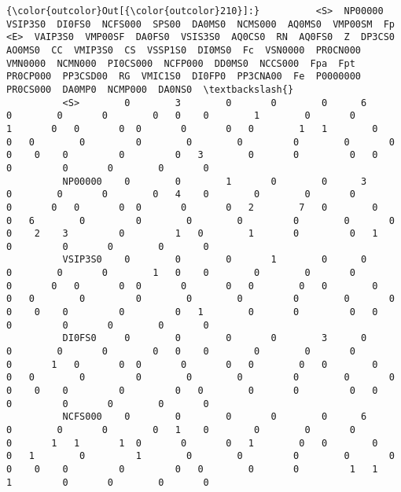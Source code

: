 \documentclass[11pt]{article}
\begin{document}
\begin{Verbatim}[commandchars=\\\{\}]
{\color{outcolor}Out[{\color{outcolor}210}]:}          <S>  NP00000  VSIP3S0  DI0FS0  NCFS000  SPS00  DA0MS0  NCMS000  AQ0MS0  VMP00SM  Fp  <E>  VAIP3S0  VMP00SF  DA0FS0  VSIS3S0  AQ0CS0  RN  AQ0FS0  Z  DP3CS0  AO0MS0  CC  VMIP3S0  CS  VSSP1S0  DI0MS0  Fc  VSN0000  PR0CN000  VMN0000  NCMN000  PI0CS000  NCFP000  DD0MS0  NCCS000  Fpa  Fpt  PR0CP000  PP3CSD00  RG  VMIC1S0  DI0FP0  PP3CNA00  Fe  P0000000  PR0CS000  DA0MP0  NCMP000  DA0NS0  \textbackslash{}
          <S>        0        3        0       0        0      6       0        0       0        0   0    0        1        0       0        1       0   0       0  0       0       0   0        1   1        0       0   0        0         0        0        0         0        0       0        0    0    0         0         0   3        0       0         0   0         0         0       0        0       0   
          NP00000    0        0        1       0        0      3       0        0       0        0   4    0        0        0       0        0       0   0       0  0       0       0   2        7   0        0       0   6        0         0        0        0         0        0       0        0    2    3         0         1   0        1       0         0   1         0         0       0        0       0   
          VSIP3S0    0        0        0       1        0      0       0        0       0        1   0    0        0        0       0        0       0   0       0  0       0       0   0        0   0        0       0   0        0         0        0        0         0        0       0        0    0    0         0         0   1        0       0         0   0         0         0       0        0       0   
          DI0FS0     0        0        0       0        3      0       0        0       0        0   0    0        0        0       0        0       1   0       0  0       0       0   0        0   0        0       0   0        0         0        0        0         0        0       0        0    0    0         0         0   0        0       0         0   0         0         0       0        0       0   
          NCFS000    0        0        0       0        0      6       0        0       0        0   1    0        0        0       0        0       1   1       1  0       0       0   1        0   0        0       0   1        0         1        0        0         0        0       0        0    0    0         0         0   0        0       0         1   1         1         0       0        0       0   
          

\end{Verbatim}
\end{document}

